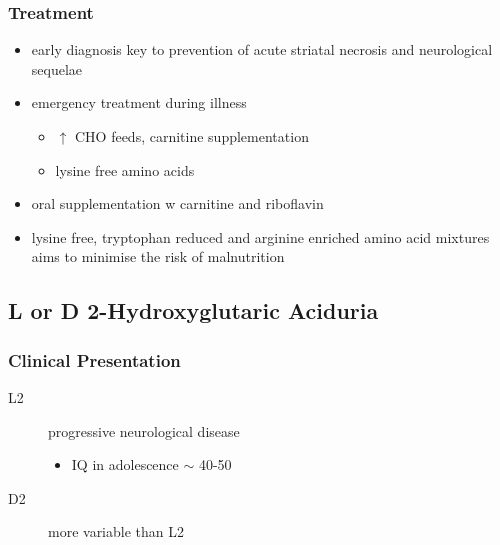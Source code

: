 \documentclass[12pt]{scrartcl}
\begin{document}
\begin{center}
\begin{center}
\subsubsection{Treatment}
\label{sec:orgfd281b2}
\begin{itemize}
\item early diagnosis key to prevention of acute striatal necrosis and
neurological sequelae
\item emergency treatment during illness
\begin{itemize}
\item \(\uparrow\) CHO feeds, carnitine supplementation
\item lysine free amino acids
\end{itemize}
\item oral supplementation w carnitine and riboflavin
\item lysine free, tryptophan reduced and arginine enriched amino acid
mixtures aims to minimise the risk of malnutrition
\end{itemize}

\subsection{L or D 2-Hydroxyglutaric Aciduria}
\label{sec:org47b0a50}
\subsubsection{Clinical Presentation}
\label{sec:orgf41330a}
\begin{description}
\item[{L2}] progressive neurological disease
\begin{itemize}
\item IQ in adolescence \(\sim\) 40-50
\end{itemize}
\item[{D2}] more variable than L2
\end{description}


\end{center}
\end{center}
\end{document}
